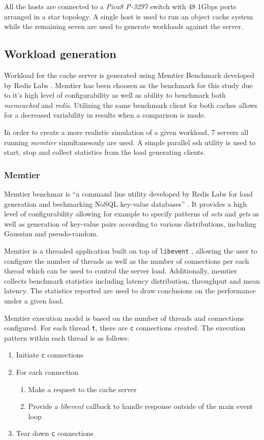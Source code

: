 All the hosts are connected to a \textit{Pica8 P-3297} switch with 48 1Gbps ports arranged in a star topology. A single host is used to run an object cache system while the remaining seven are used to generate workloads against the server.

\subsection{Workload generation}
Workload for the cache server is generated using Memtier Benchmark developed by Redis Labs \cite{memtier}. Memtier has been choosen as the benchmark for this study due to it's high level of configurability as well as ability to benchmark both \textit{memcached} and \textit{redis}. Utilizing the same benchmark client for both caches allows for a decreased variability in results when a comparison is made.

In order to create a more realistic simulation of a given workload, 7 servers all running \textit{memtier} simultanesouly are used. A simple parallel ssh utility is used to start, stop and collect statistics from the load generating clients.

\subsubsection{Memtier}
Memtier benchmar is ``a command line utility developed by Redis Labs for load generation and bechmarking NoSQL key-value databases'' \cite{memtier}. It provides a high level of configurability allowing for example to specify patterns of \textit{sets} and \textit{gets} as well as generation of key-value pairs according to various distributions, including Gaussian and pseudo-random.

Memtier is a threaded application built on top of \texttt{libevent} \cite{libevent}, allowing the user to configure the number of threads as well as the number of connections per each thread which can be used to control the server load. Additionally, memtier collects benchmark statistics including latency distribution, throughput and mean latency. The statistics reported are used to draw conclusions on the performance under a given load.

Memtier execution model is based on the number of threads and connections configured. For each thread \texttt{t}, there are \texttt{c} connections created. The execution pattern within each thread is as follows:

\begin{enumerate}
    \item Initiate \texttt{c} connections
    \item For each connection
        \begin{enumerate}
            \item Make a request to the cache server
            \item Provide a \textit{libevent} callback to handle response outside of the main event loop
        \end{enumerate}
    \item Tear down \texttt{c} connections
\end{enumerate}


